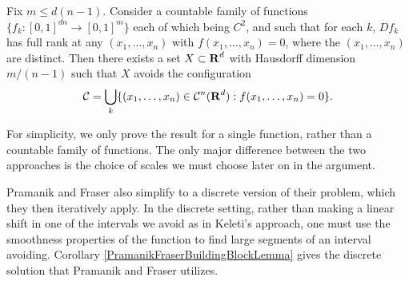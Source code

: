 \begin{theorem} \label{pramanikandfrasertheorem}
    Fix $m \leq d(n-1)$. Consider a countable family of functions $\{ f_k : [0,1]^{dn} \to [0,1]^m \}$ each of which being $C^2$, and such that for each $k$, $Df_k$ has full rank at any $(x_1, \dots, x_n)$ with $f(x_1, \dots, x_n) = 0$, where the $(x_1, \dots, x_n)$ are distinct. Then there exists a set $X \subset \operatorname{\mathbf{R}}^d$ with Hausdorff dimension $m/(n-1)$ such that $X$ avoids the configuration
    \[ \operatorname{\mathcal{C}} = \bigcup_k \{ (x_1, \dots, x_n) \in \operatorname{\mathcal{C}}^n(\operatorname{\mathbf{R}}^d): f(x_1, \dots, x_n) = 0 \}. \]
\end{theorem}

\begin{remark}
    For simplicity, we only prove the result for a single function, rather than a countable family of functions. The only major difference between the two approaches is the choice of scales we must choose later on in the argument.
\end{remark}

Pramanik and Fraser also simplify to a discrete version of their problem, which they then iteratively apply. In the discrete setting, rather than making a linear shift in one of the intervals we avoid as in Keleti's approach, one must use the smoothness properties of the function to find large segments of an interval avoiding. Corollary \ref{PramanikFraserBuildingBlockLemma} gives the discrete solution that Pramanik and Fraser utilizes.

